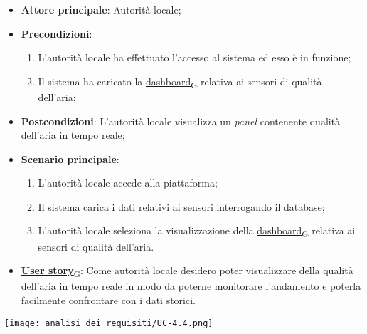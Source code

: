 \begin{itemize}
	\item \textbf{Attore principale}: Autorità locale;
	\item \textbf{Precondizioni}:
	      \begin{enumerate}
		      \item L'autorità locale ha effettuato l'accesso al sistema ed esso è in funzione;
		      \item Il sistema ha caricato la \href{https://7last.github.io/docs/rtb/documentazione-interna/glossario\#dashboard}{dashboard\textsubscript{G}} relativa ai sensori di qualità dell'aria;
	      \end{enumerate}
	\item \textbf{Postcondizioni}: L'autorità locale visualizza un \textit{panel} contenente qualità dell'aria in tempo reale;
	\item \textbf{Scenario principale}:
	      \begin{enumerate}
		      \item L'autorità locale accede alla piattaforma;
		      \item Il sistema carica i dati relativi ai sensori interrogando il database;
		      \item L'autorità locale seleziona la visualizzazione della \href{https://7last.github.io/docs/rtb/documentazione-interna/glossario\#dashboard}{dashboard\textsubscript{G}} relativa ai sensori di qualità dell'aria.
	      \end{enumerate}
	\item \href{https://7last.github.io/docs/rtb/documentazione-interna/glossario\#user-story}{\textbf{User story}\textsubscript{G}}:
	      Come autorità locale desidero poter visualizzare della qualità dell'aria in tempo reale in modo da poterne monitorare l'andamento
	      e poterla facilmente confrontare con i dati storici.
\end{itemize}
\begin{center}
	\texttt{[image: analisi\_dei\_requisiti/UC-4.4.png]}
\end{center}

